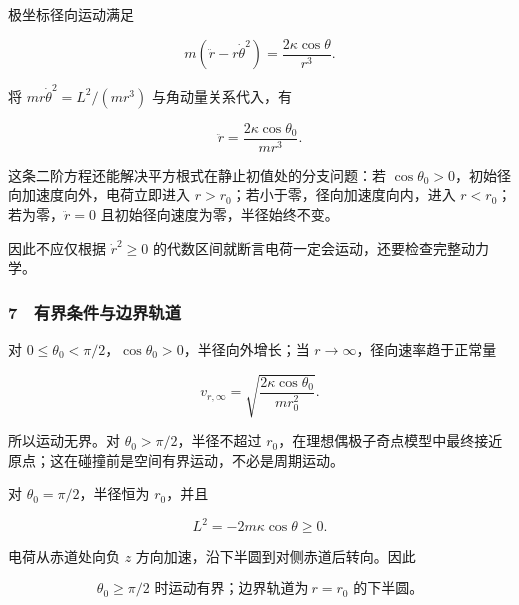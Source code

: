 \documentclass[12pt,a4paper,fontset=fandol]{ctexart}
\begin{document}
极坐标径向运动满足

\[m(\ddot r-r\dot\theta^2)=\frac{2\kappa\cos\theta}{r^3}.\]

将 \(mr\dot\theta^2=L^2/(mr^3)\) 与角动量关系代入，有

\[\boxed{\ddot r=\frac{2\kappa\cos\theta_0}{mr^3}.}\]

这条二阶方程还能解决平方根式在静止初值处的分支问题：若
\(\cos\theta_0>0\)，初始径向加速度向外，电荷立即进入
\(r>r_0\)；若小于零，径向加速度向内，进入
\(r<r_0\)；若为零，\(\ddot r=0\) 且初始径向速度为零，半径始终不变。

因此不应仅根据 \(\dot r^2\ge0\)
的代数区间就断言电荷一定会运动，还要检查完整动力学。

\subsubsection{7　有界条件与边界轨道}\label{ux6709ux754cux6761ux4ef6ux4e0eux8fb9ux754cux8f68ux9053}

对 \(0\le\theta_0<\pi/2\)，\(\cos\theta_0>0\)，半径向外增长；当
\(r\to\infty\)，径向速率趋于正常量

\[v_{r,\infty}=\sqrt{\frac{2\kappa\cos\theta_0}{mr_0^2}}.\]

所以运动无界。对 \(\theta_0>\pi/2\)，半径不超过
\(r_0\)，在理想偶极子奇点模型中最终接近原点；这在碰撞前是空间有界运动，不必是周期运动。

对 \(\theta_0=\pi/2\)，半径恒为 \(r_0\)，并且

\[L^2=-2m\kappa\cos\theta\ge0.\]

电荷从赤道处向负 \(z\) 方向加速，沿下半圆到对侧赤道后转向。因此

\[\boxed{\theta_0\ge\pi/2\text{ 时运动有界；边界轨道为}\ r=r_0\text{ 的下半圆。}}\]

\begin{center}
\begin{minipage}{\linewidth}
\centering\begingroup{}
\ifdim\wd\diagrambox>.88\linewidth
\sbox{\diagrambox}{\resizebox{.88\linewidth}{!}{\usebox{\diagrambox}}}\fi
\ifdim\ht\diagrambox>.38\textheight
\resizebox{!}{.38\textheight}{\usebox{\diagrambox}}
\else\usebox{\diagrambox}\fi
\par{}\endgroup\end{minipage}\end{center}
\end{document}
